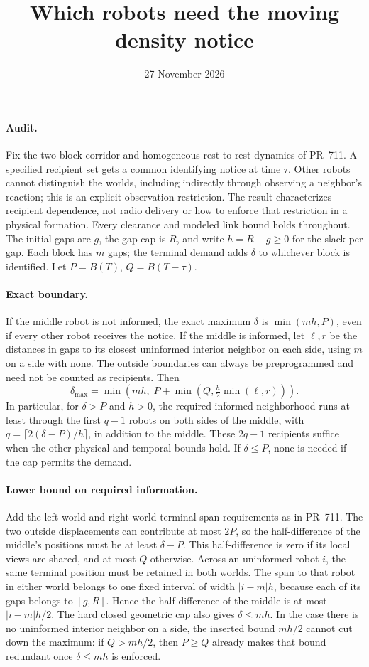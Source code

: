 \documentclass[11pt]{article}
\title{Which robots need the moving density notice}
\date{27 November 2026}
\begin{document}
\maketitle
\paragraph{Audit.}
Fix the two-block corridor and homogeneous rest-to-rest dynamics
of PR~711. A specified recipient set gets a common identifying
notice at time \(\tau\). Other robots cannot distinguish the
worlds, including indirectly through observing a neighbor's
reaction; this is an explicit observation restriction. The
result characterizes recipient dependence, not radio delivery
or how to enforce that restriction in a physical formation.
Every clearance and modeled link bound holds throughout.
The initial gaps are \(g\), the gap cap is \(R\), and write
\(h=R-g\ge0\) for the slack per gap. Each block has \(m\)
gaps; the terminal demand adds \(\delta\) to whichever
block is identified. Let \(P=B(T)\), \(Q=B(T-\tau)\).

\paragraph{Exact boundary.}
If the middle robot is not informed, the exact maximum
\(\delta\) is \(\min(mh,P)\), even if every other robot
receives the notice. If the middle is informed, let
\(\ell,r\) be the distances in gaps to its closest
uninformed interior neighbor on each side, using \(m\)
on a side with none. The outside boundaries can always be
preprogrammed and need not be counted as recipients. Then
\[
 \delta_{\max}
   =\min\left(mh,\;P+\min\left(Q,\tfrac{h}{2}
                              \min(\ell,r)\right)\right).
\]
In particular, for \(\delta>P\) and \(h>0\), the required
informed neighborhood runs at least through the first
\(q-1\) robots on both sides of the middle, with
\(q=\lceil 2(\delta-P)/h\rceil\), in addition to the middle.
These \(2q-1\) recipients suffice when the other physical
and temporal bounds hold. If \(\delta\le P\), none is needed
if the cap permits the demand.

\paragraph{Lower bound on required information.}
Add the left-world and right-world terminal span
requirements as in PR~711. The two outside displacements
can contribute at most \(2P\), so the half-difference of
the middle's positions must be at least \(\delta-P\).
This half-difference is zero if its local views are shared,
and at most \(Q\) otherwise. Across an uninformed robot
\(i\), the same terminal position must be retained in both
worlds. The span to that robot in either world belongs to
one fixed interval of width \(|i-m|h\), because each of
its gaps belongs to \([g,R]\). Hence the half-difference of
the middle is at most \(|i-m|h/2\). The hard closed
geometric cap also gives \(\delta\le mh\). In the case
there is no uninformed interior neighbor on a side,
the inserted bound \(mh/2\) cannot cut down the maximum:
if \(Q>mh/2\), then \(P\ge Q\) already makes that bound
redundant once \(\delta\le mh\) is enforced.
\end{document}
